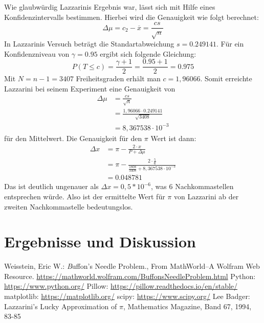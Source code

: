 \documentclass[10pt,twocolumn]{scrartcl}
\begin{document}
	Wie glaubwürdig Lazzarinis Ergebnis war, lässt sich mit Hilfe eines Konfidenzintervalls bestimmen. Hierbei wird die Genauigkeit wie folgt berechnet:
	\begin{equation}
	\Delta \mu = c_2 - \overline{x} = \frac{cs}{\sqrt{n}}
	\end{equation}
	In Lazzarinis Versuch beträgt die Standartabweichung $s = 0.249141$.
	Für ein Konfidenzniveau von $\gamma = 0.95$ ergibt sich folgende Gleichung:
	\begin{equation}
	P(T \le c) = \frac{\gamma + 1}{2} = \frac{0.95 + 1}{2} = 0.975
	\end{equation}
	Mit $N = n - 1 = 3407$ Freiheitsgraden erhält man $c = 1,96066$.
	Somit erreichte Lazzarini bei seinem Experiment eine Genauigkeit von
	\begin{align}
	\Delta \mu &= \frac{cs}{\sqrt{n}} \\
	&= \frac{1,96066 \cdot 0.249141}{\sqrt{3408}} \\ \nonumber
	&= 8,367538 \cdot 10 ^{-3} \nonumber
	\end{align}
	für den Mittelwert. Die Genauigkeit für den $\pi$ Wert ist dann:
	\begin{align}
	\Delta x &= \pi - \frac{2 \cdot x}{P + \Delta \mu} \\
	&= \pi - \frac{2 \cdot \frac{5}{6}}{\frac{1808}{3408} + 8,367538 \cdot 10 ^{-3}} \\ \nonumber
	&= 0.048781 \nonumber
	\end{align}
	Das ist deutlich ungenauer als $\Delta x = 0,5 * 10^{-6}$, was 6 Nachkommastellen entsprechen würde.
	Also ist der ermittelte Wert für $\pi$ von Lazzarini ab der zweiten Nachkommastelle bedeutungslos.
	
\section*{Ergebnisse und Diskussion}

\begin{thebibliography}{99}
	Weisstein, Eric W.: {\textit Buffon's Needle Problem.}, From MathWorld--A Wolfram Web Resource. \url{https://mathworld.wolfram.com/BuffonsNeedleProblem.html}
	Python: \url{https://www.python.org/}
	Pillow: \url{https://pillow.readthedocs.io/en/stable/}
	matplotlib: \url{https://matplotlib.org/}
	scipy: \url{https://www.scipy.org/}
	Lee Badger: Lazzarini’s Lucky Approximation of $\pi$, Mathematics Magazine, Band 67, 1994, 83-85
\end{thebibliography}
\end{document}
